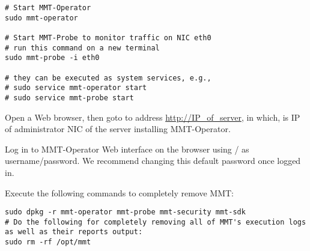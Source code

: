 \begin{lstlisting}[style=BASH]
# Start MMT-Operator
sudo mmt-operator

# Start MMT-Probe to monitor traffic on NIC eth0
# run this command on a new terminal
sudo mmt-probe -i eth0

# they can be executed as system services, e.g.,
# sudo service mmt-operator start
# sudo service mmt-probe start

\end{lstlisting}

Open a Web browser, then goto to address \url{http://IP_of_server}, in which,  is IP of administrator NIC of the server installing MMT-Operator.

Log in to MMT-Operator Web interface on the browser using / as username/password. We recommend changing this default password once logged in.


Execute the following commands to completely remove MMT:

\begin{lstlisting}[style=BASH]
sudo dpkg -r mmt-operator mmt-probe mmt-security mmt-sdk
# Do the following for completely removing all of MMT's execution logs as well as their reports output:
sudo rm -rf /opt/mmt
\end{lstlisting}








